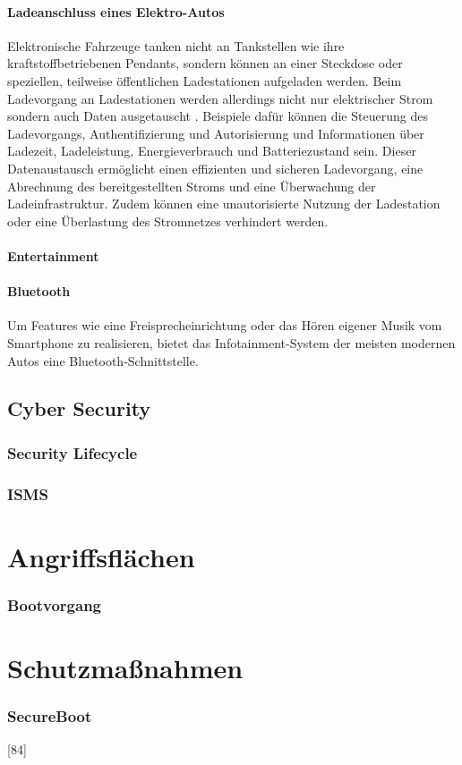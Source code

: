 \subsubsection{Ladeanschluss eines Elektro-Autos}
Elektronische Fahrzeuge tanken nicht an Tankstellen wie ihre kraftstoffbetriebenen Pendants, sondern können an einer Steckdose oder speziellen, teilweise öffentlichen Ladestationen aufgeladen werden. Beim Ladevorgang an Ladestationen werden allerdings nicht nur elektrischer Strom sondern auch Daten ausgetauscht \cite[3]{Checkoway.2011}. Beispiele dafür können die Steuerung des Ladevorgangs, Authentifizierung und Autorisierung und Informationen über Ladezeit, Ladeleistung, Energieverbrauch und Batteriezustand sein. Dieser Datenaustausch ermöglicht einen effizienten und sicheren Ladevorgang, eine Abrechnung des bereitgestellten Stroms und eine Überwachung der Ladeinfrastruktur. Zudem können eine unautorisierte Nutzung der Ladestation oder eine Überlastung des Stromnetzes verhindert werden. 

\subsubsection{Entertainment}




\subsubsection{Bluetooth}
Um Features wie eine Freisprecheinrichtung oder das Hören eigener Musik vom Smartphone zu realisieren, bietet das Infotainment-System der meisten modernen Autos eine Bluetooth-Schnittstelle. 

\section{Cyber Security}
\subsection{Security Lifecycle}
\cite{Wurm.2022}
\subsection{ISMS}


\chapter{Angriffsflächen}
\subsection{Bootvorgang}
\cite{Wurm.2022}


\chapter{Schutzmaßnahmen}
\subsection{SecureBoot}
\cite{Wurm.2022}[84]